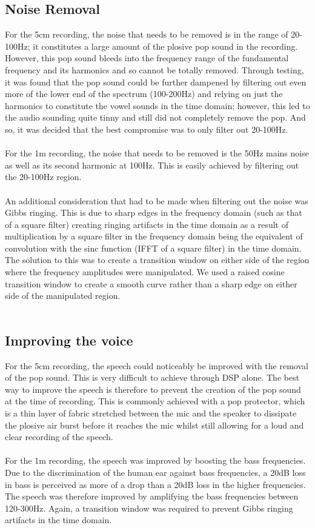 \documentclass[12pt]{extarticle}
\begin{document}
\subsection*{Noise Removal}
For the 5cm recording, the noise that needs to be removed is in the range of 20-100Hz; it constitutes a large amount of the plosive pop sound in the recording. However, this pop sound bleeds into the frequency range of the fundamental frequency and its harmonics and so cannot be totally removed. Through testing, it was found that the pop sound could be further dampened by filtering out even more of the lower end of the spectrum (100-200Hz) and relying on just the harmonics to constitute the vowel sounds in the time domain; however, this led to the audio sounding quite tinny and still did not completely remove the pop. And so, it was decided that the best compromise was to only filter out 20-100Hz.\\\\
For the 1m recording, the noise that needs to be removed is the 50Hz mains noise as well as its second harmonic at 100Hz. This is easily achieved by filtering out the 20-100Hz region. \\\\
An additional consideration that had to be made when filtering out the noise was Gibbs ringing. This is due to sharp edges in the frequency domain (such as that of a square filter) creating ringing artifacts in the time domain as a result of multiplication by a square filter in the frequency domain being the equivalent of convolution with the sinc function (IFFT of a square filter) in the time domain. The solution to this was to create a transition window on either side of the region where the frequency amplitudes were manipulated. We used a raised cosine transition window to create a smooth curve rather than a sharp edge on either side of the manipulated region. \\\\

\subsection*{Improving the voice}
For the 5cm recording, the speech could noticeably be improved with the removal of the pop sound. This is very difficult to achieve through DSP alone. The best way to improve the speech is therefore to prevent the creation of the pop sound at the time of recording. This is commonly achieved with a pop protector, which is a thin layer of fabric stretched between the mic and the speaker to dissipate the plosive air burst before it reaches the mic whilst still allowing for a loud and clear recording of the speech.\\\\
For the 1m recording, the speech was improved by boosting the bass frequencies. Due to the discrimination of the human ear against bass frequencies, a 20dB loss in bass is perceived as more of a drop than a 20dB loss in the higher frequencies. The speech was therefore improved by amplifying the bass frequencies between 120-300Hz. Again, a transition window was required to prevent Gibbs ringing artifacts in the time domain.\\\\
\end{document}
